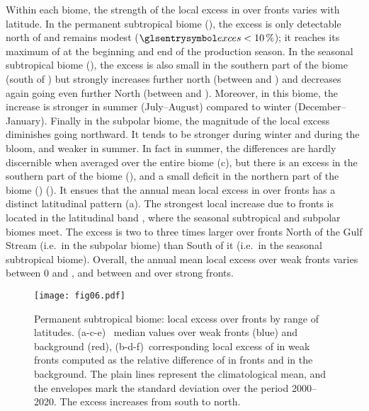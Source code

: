 Within each biome, the strength of the local excess in  over fronts varies with latitude.
In the permanent subtropical biome (), the excess is only detectable north of  and remains modest (\(\am{exces} < \pct{10}\)); it reaches its maximum of  at the beginning and end of the production season.
In the seasonal subtropical biome (), the excess is also small in the southern part of the biome (south of ) but strongly increases further north (between  and ) and decreases again going even further North (between  and ).
Moreover, in this biome, the increase is stronger in summer (July--August) compared to winter (December--January).
Finally in the subpolar biome, the magnitude of the local excess diminishes going northward.
It tends to be stronger during winter and during the bloom, and weaker in summer.
In fact in summer, the differences are hardly discernible when averaged over the entire biome (c), but there is an excess  in the southern part of the biome (), and a small deficit in the northern part of the biome () ().
It ensues that the annual mean local excess in  over fronts has a distinct latitudinal pattern (a).
The strongest local increase due to fronts is located in the latitudinal band , where the seasonal subtropical and subpolar biomes meet.
The excess is two to three times larger over fronts North of the Gulf Stream (i.e.\ in the subpolar biome) than South of it (i.e.\ in the seasonal subtropical biome).
Overall, the annual mean local excess over weak fronts varies between \num{0} and , and between  and  over strong fronts.


\begin{figure*}
  \centering
  \texttt{[image: fig06.pdf]}
  \caption[Local impact of front on Chl-\textit{a} in the permanent subtropical biome]{
    Permanent subtropical biome: local  excess over fronts by range of latitudes.
    (a-c-e)~ median values over weak fronts (blue) and background (red), (b-d-f)~corresponding local excess of  in weak fronts computed as the relative difference of  in fronts and in the background.
    The plain lines represent the climatological mean, and the envelopes mark the standard deviation over the period 2000--2020.
    The excess increases from south to north.
  }%
  \label{fig:latbands-s}
\end{figure*}

